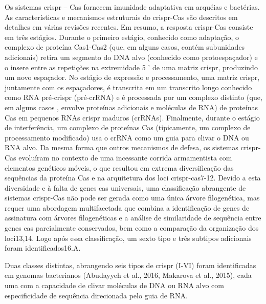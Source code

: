 \documentclass{report}
\begin{document}
Os sistemas \ac{crispr} – Cas fornecem imunidade adaptativa em arquéias e bactérias. As características e mecanismos estruturais do \ac{crispr}-Cas são descritos em detalhes em várias revisões recentes. Em resumo, a resposta \ac{crispr}-Cas consiste em três estágios. Durante o primeiro estágio, conhecido como adaptação, o complexo de proteína Cas1-Cas2 (que, em alguns casos, contém subunidades adicionais) retira um segmento do DNA alvo (conhecido como protoespaçador) e o insere entre as repetições na extremidade 5 ' de uma matriz \ac{crispr}, produzindo um novo espaçador. No estágio de expressão e processamento, uma matriz \ac{crispr}, juntamente com os espaçadores, é transcrita em um transcrito longo conhecido como RNA pré-\ac{crispr} (pré-crRNA) e é processada por um complexo distinto (que, em alguns casos , envolve proteínas adicionais e moléculas de RNA) de proteínas Cas em pequenos RNAs \ac{crispr} maduros (crRNAs). Finalmente, durante o estágio de interferência, um complexo de proteínas Cas (tipicamente, um complexo de processamento modificado) usa o crRNA como um guia para clivar o DNA ou RNA alvo. Da mesma forma que outros mecanismos de defesa, os sistemas \ac{crispr}-Cas evoluíram no contexto de uma incessante corrida armamentista com elementos genéticos móveis, o que resultou em extrema diversificação das sequências da proteína Cas e na arquitetura dos loci \ac{crispr}-cas7-12. Devido a esta diversidade e à falta de genes cas universais, uma classificação abrangente de sistemas \ac{crispr}-Cas não pode ser gerada como uma única árvore filogenética, mas requer uma abordagem multifacetada que combina a identificação de genes de assinatura com árvores filogenéticas e a análise de similaridade de sequência entre genes cas parcialmente conservados, bem como a comparação da organização dos loci13,14.  Logo após essa classificação, um sexto tipo e três subtipos adicionais foram identificados16.A.
\par
 Duas classes distintas, abrangendo seis tipos de \ac{crispr} (I-VI) foram identificadas em genomas bacterianos (Abudayyeh et al., 2016, Makarova et al., 2015), cada uma com a capacidade de clivar moléculas de DNA ou RNA alvo com especificidade de sequência direcionada pelo guia de RNA. 
\end{document}
